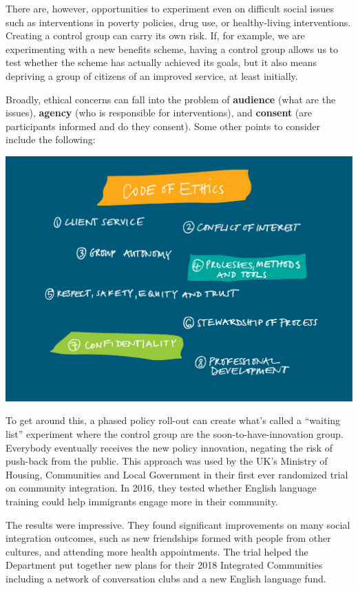 \documentclass[]{book}
\begin{document}
There are, however, opportunities to experiment even on difficult social issues such as interventions in poverty policies, drug use, or healthy-living interventions. Creating a control group can carry its own risk. If, for example, we are experimenting with a new benefits scheme, having a control group allows us to test whether the scheme has actually achieved its goals, but it also means depriving a group of citizens of an improved service, at least initially.

Broadly, ethical concerns can fall into the problem of \textbf{audience} (what are the issues), \textbf{agency} (who is responsible for interventions), and \textbf{consent} (are participants informed and do they consent). Some other points to consider include the following:

\includegraphics{fig/CodeOfEthics.jpg}

To get around this, a phased policy roll-out can create what's called a ``waiting list'' experiment where the control group are the soon-to-have-innovation group. Everybody eventually receives the new policy innovation, negating the risk of push-back from the public. This approach was used by the UK's Ministry of Housing, Communities and Local Government in their first ever randomized trial on community integration. In 2016, they tested whether English language training could help immigrants engage more in their community.

The results were impressive. They found significant improvements on many social integration outcomes, such as new friendships formed with people from other cultures, and attending more health appointments. The trial helped the Department put together new plans for their 2018 Integrated Communities including a network of conversation clubs and a new English language fund.
\end{document}
